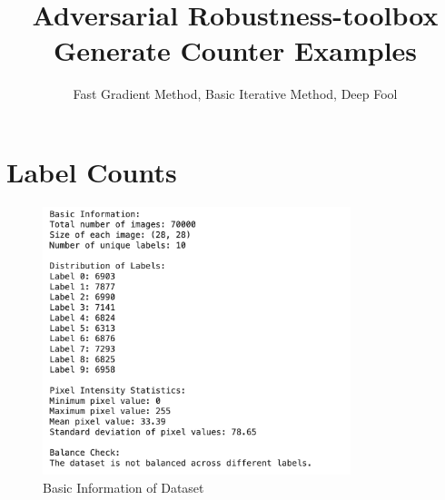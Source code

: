 \documentclass[11pt,onside]{article}
\title{\blue Adversarial Robustness-toolbox \\
\blueb Generate Counter Examples}
\author{Fast Gradient Method, Basic Iterative Method, Deep Fool}
\begin{document}
\maketitle


\section{Label Counts}

\begin{figure}[h]
\centering
\includegraphics[width=0.8\textwidth]{V2_images/basic_info.png}
\caption{Basic Information of Dataset}
\label{fig:Basic Information of Dataset}
\end{figure}
\end{document}
